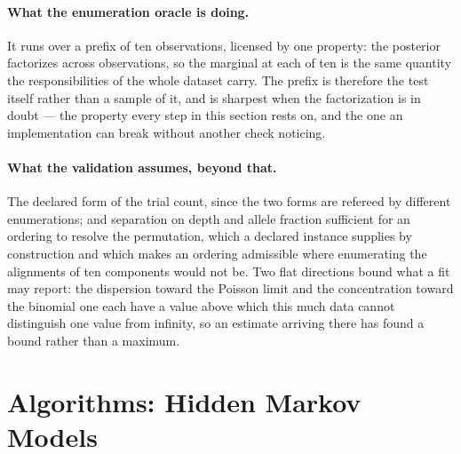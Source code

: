 \documentclass[11pt,a4paper]{article}
\begin{document}
\paragraph{What the enumeration oracle is doing.}
It runs over a prefix of ten observations, licensed by one property: the
posterior factorizes across observations, so the marginal at each of ten is the
same quantity the responsibilities of the whole dataset carry. The prefix is
therefore the test itself rather than a sample of it, and is sharpest when the
factorization is in doubt --- the property every step in this section rests on,
and the one an implementation can break without another check noticing.

\paragraph{What the validation assumes, beyond that.}
The declared form of the trial count, since the two forms are refereed by
different enumerations; and separation on depth and allele fraction sufficient
for an ordering to resolve the permutation, which a declared instance supplies
by construction and which makes an ordering admissible where enumerating the
alignments of ten components would not be. Two flat directions bound what a fit
may report: the dispersion toward the Poisson limit and the concentration
toward the binomial one each have a value above which this much data cannot
distinguish one value from infinity, so an estimate arriving there has found a
bound rather than a maximum.

\section{Algorithms: Hidden Markov Models}
\label{sec:hmm:algorithms}
\end{document}
